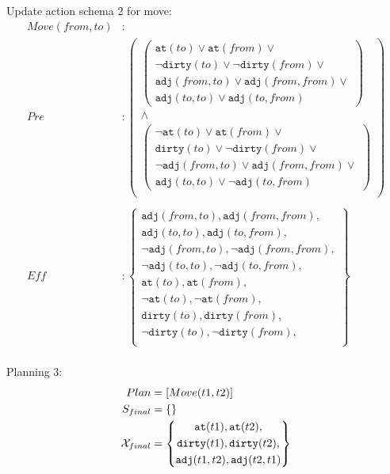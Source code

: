 \documentclass[\master/Master.tex]{subfiles}
\begin{document}
Update action schema 2 for move:
\begin{align*}
	Move(from,to) &: \\
	Pre &:
	\left( 
	\begin{gathered}
	\left(
	\begin{gathered}
		\texttt{at}(to) \lor \texttt{at}(from) \lor  \\
		\neg \texttt{dirty}(to) \lor  \neg \texttt{dirty}(from) \lor  \\
		\texttt{adj}(from,to) \lor   \texttt{adj}(from,from) \lor  \\
		\texttt{adj}(to,to) \lor  \texttt{adj}(to,from)
	\end{gathered}
	\right) \\ 
	\land \\
	\left(
	\begin{gathered}
		\neg \texttt{at}(to)\lor  \texttt{at}(from)\lor  \\
		\texttt{dirty}(to)\lor  \neg \texttt{dirty}(from)\lor  \\
		\neg \texttt{adj}(from,to)\lor   \texttt{adj}(from,from)\lor  \\
		\texttt{adj}(to,to)\lor  \neg  \texttt{adj}(to,from)
	\end{gathered}
	\right)\\
	\end{gathered}
	\right)\\
	\\
	Eff &: 
	\left\{
	\begin{gathered}
		\texttt{adj}(from,to), \texttt{adj}(from,from), \\
		\texttt{adj}(to,to), \texttt{adj}(to,from), \\
		\neg \texttt{adj}(from,to), \neg \texttt{adj}(from,from), \\
		\neg \texttt{adj}(to,to), \neg \texttt{adj}(to,from), \\					
		\texttt{at}(to), \texttt{at}(from), \\
		\neg \texttt{at}(to), \neg \texttt{at}(from), \\					
		\texttt{dirty}(to), \texttt{dirty}(from), \\
		\neg \texttt{dirty}(to), \neg \texttt{dirty}(from), \\
	\end{gathered}
	\right\}
	\\
\end{align*}

Planning 3:
\begin{align*}
	Plan &= [Move(t1,t2)]\\
	S_{final} &=  \{\}\\
	\mathcal{X}_{final} &= \left\{
	\begin{gathered}
		\texttt{at}(t1), \texttt{at}(t2), \\
		\texttt{dirty}(t1), \texttt{dirty}(t2), \\
		\texttt{adj}(t1,t2),  \texttt{adj}(t2,t1) \\
	\end{gathered}
	\right\}
\end{align*}
\end{document}
